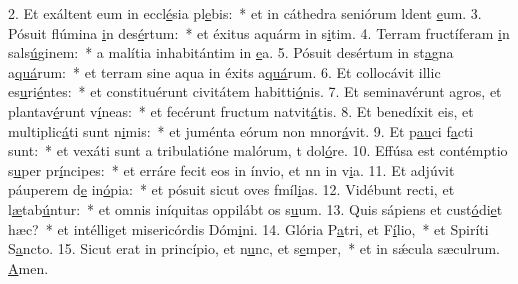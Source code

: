 2. Et exáltent eum in eccl\uline{é}sia pl\uline{e}bis:~* et in cáthedra seniórum ldent \uline{e}um.
3. Pósuit flúmina \uline{i}n des\uline{é}rtum:~* et éxitus aquárm in s\uline{i}tim.
4. Terram fructíferam \uline{i}n sals\uline{ú}ginem:~* a malítia inhabitántim in \uline{e}a.
5. Pósuit desértum in st\uline{a}gna a\uline{quá}rum:~* et terram sine aqua in éxits a\uline{quá}rum.
6. Et collocávit illic es\uline{u}ri\uline{é}ntes:~* et constituérunt civitátem habitti\uline{ó}nis.
7. Et seminavérunt agros, et plantav\uline{é}runt v\uline{í}neas:~* et fecérunt fructum natvit\uline{á}tis.
8. Et benedíxit eis, et multiplic\uline{á}ti sunt n\uline{i}mis:~* et juménta eórum non mnor\uline{á}vit.
9. Et p\uline{au}ci f\uline{a}cti sunt:~* et vexáti sunt a tribulatióne malórum, t dol\uline{ó}re.
10. Effúsa est contémptio s\uline{u}per pr\uline{í}ncipes:~* et erráre fecit eos in ínvio, et nn in v\uline{i}a.
11. Et adjúvit páuperem d\uline{e} in\uline{ó}pia:~* et pósuit sicut oves fmíl\uline{i}as.
12. Vidébunt recti, et l\uline{æ}tab\uline{ú}ntur:~* et omnis iníquitas oppilábt os s\uline{u}um.
13. Quis sápiens et cust\uline{ó}di\uline{e}t hæc?~* et intélliget misericórdis Dóm\uline{i}ni.
14. Glória P\uline{a}tri, et F\uline{í}lio,~* et Spiríti S\uline{a}ncto.
15. Sicut erat in princípio, et n\uline{u}nc, et s\uline{e}mper,~* et in sǽcula sæculrum. \uline{A}men.
